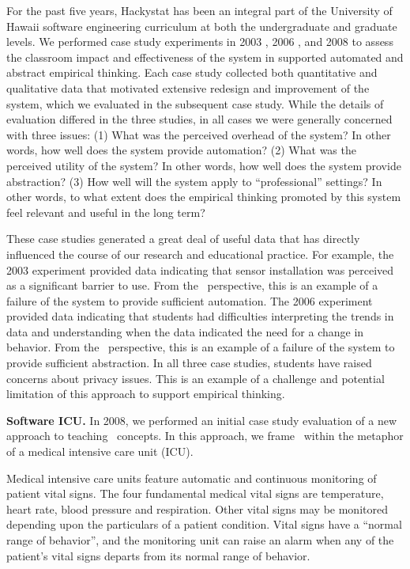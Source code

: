 For the past five years, Hackystat has been an integral part of the
University of Hawaii software engineering curriculum at both the
undergraduate and graduate levels.  We performed case study experiments in
2003 \citep{csdl2-03-12,csdl2-03-13}, 2006 \citep{csdl2-07-02}, and 2008
\citep{csdl2-09-02,csdl2-09-03} to assess the classroom impact and
effectiveness of the system in supported automated and abstract empirical
thinking.  Each case study collected both quantitative and qualitative data
that motivated extensive redesign and improvement of the system, which we
evaluated in the subsequent case study. While the details of evaluation
differed in the three studies, in all cases we were generally concerned
with three issues: (1) What was the perceived overhead of the system? In
other words, how well does the system provide automation?  (2) What was the
perceived utility of the system? In other words, how well does the system
provide abstraction?  (3) How well will the system apply to
``professional'' settings?  In other words, to what extent does the
empirical thinking promoted by this system feel relevant and useful in the
long term?

These case studies generated a great deal of useful data that has directly
influenced the course of our research and educational practice. For
example, the 2003 experiment provided data indicating that sensor
installation was perceived as a significant barrier to use. From the \eCT\
perspective, this is an example of a failure of the system to provide
sufficient automation.  The 2006 experiment provided data indicating that
students had difficulties interpreting the trends in data and understanding
when the data indicated the need for a change in behavior.  From the \eCT\
perspective, this is an example of a failure of the system to provide
sufficient abstraction.  In all three case studies, students have raised
concerns about privacy issues.  This is an example of a challenge and
potential limitation of this approach to support empirical thinking.

{\bf Software ICU.}  In 2008, we performed an initial case study evaluation 
of a new approach to teaching \eCT\ concepts.  In this approach, we frame 
\eCT\ within the metaphor of a medical intensive care unit (ICU). 

Medical intensive care units feature automatic and continuous monitoring of
patient vital signs.  The four fundamental medical vital signs are
temperature, heart rate, blood pressure and respiration.  Other vital signs
may be monitored depending upon the particulars of a patient condition.
Vital signs have a ``normal range of behavior'', and the monitoring unit
can raise an alarm when any of the patient's vital signs departs from its
normal range of behavior.

